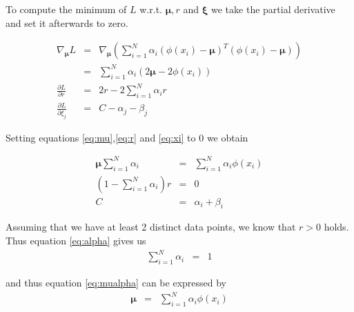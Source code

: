 \documentclass[a4paper, 12pt, titlepage]{article}
\begin{document}
To compute the minimum of $L$ w.r.t. $\boldsymbol{\mu}, r$ and $\boldsymbol{\xi}$ we take the partial derivative and set it afterwards to zero.

\begin{eqnarray}
	\nabla_{\boldsymbol{\mu}} L &=& \nabla_{\boldsymbol{\mu}} \left( \sum_{i=1}^N \alpha_i \left( \phi(x_i) - \boldsymbol{\mu} \right)^T \left( \phi(x_i) - \boldsymbol{\mu} \right) \right) \nonumber \\
	&=& \sum_{i=1}^N \alpha_i\left( 2 \boldsymbol{\mu} - 2 \phi(x_i) \right) \label{eq:mu}\\
	\frac{\partial L}{\partial r} &=& 2r -2\sum_{i=1}^N \alpha_i r \label{eq:r}\\
	\frac{\partial L}{\partial \xi_j} &=& C - \alpha_j - \beta_j \label{eq:xi}
\end{eqnarray}

Setting equations \eqref{eq:mu},\eqref{eq:r} and \eqref{eq:xi} to $0$ we obtain

\begin{eqnarray}
	\boldsymbol{\mu} \sum_{i=1}^N \alpha_i &=& \sum_{i=1}^N \alpha_i \phi(x_i) \label{eq:mualpha}\\
	(1-\sum_{i=1}^N \alpha_i)r &=& 0 \label{eq:alpha}\\
	C &=& \alpha_i + \beta_i \label{eq:C}
\end{eqnarray}

Assuming that we have at least 2 distinct data points, we know that $r>0$ holds. Thus equation \eqref{eq:alpha} gives us
\begin{eqnarray}
	\sum_{i=1}^N \alpha_i &=& 1 \label{eq:alpha1}
\end{eqnarray}

and thus equation \eqref{eq:mualpha} can be expressed by
\begin{eqnarray}
	\boldsymbol{\mu} &=& \sum_{i=1}^N\alpha_i \phi(x_i) \label{eq:mu2}
\end{eqnarray}
\end{document}
